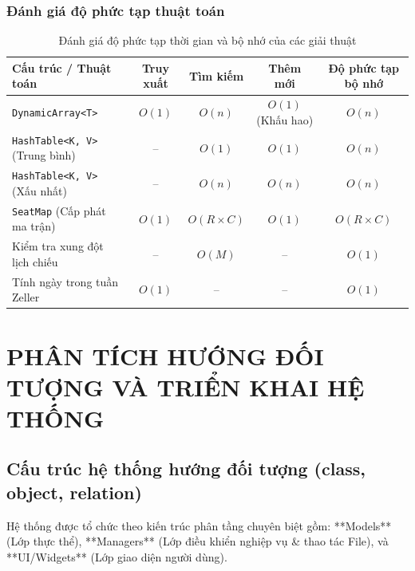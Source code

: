 \documentclass[12pt,a4paper]{article}
\begin{document}
\subsubsection{Đánh giá độ phức tạp thuật toán}
\begin{table}[htbp]
\centering
\caption{Đánh giá độ phức tạp thời gian và bộ nhớ của các giải thuật}
\vspace{0.2cm}
\begin{tabular}{lcccc}
\toprule
\textbf{Cấu trúc / Thuật toán} & \textbf{Truy xuất} & \textbf{Tìm kiếm} & \textbf{Thêm mới} & \textbf{Độ phức tạp bộ nhớ} \\
\midrule
\texttt{DynamicArray<T>} & $O(1)$ & $O(n)$ & $O(1)$ (Khấu hao) & $O(n)$ \\
\texttt{HashTable<K, V>} (Trung bình) & -- & $O(1)$ & $O(1)$ & $O(n)$ \\
\texttt{HashTable<K, V>} (Xấu nhất) & -- & $O(n)$ & $O(n)$ & $O(n)$ \\
\texttt{SeatMap} (Cấp phát ma trận) & $O(1)$ & $O(R \times C)$ & $O(1)$ & $O(R \times C)$ \\
Kiểm tra xung đột lịch chiếu & -- & $O(M)$ & -- & $O(1)$ \\
Tính ngày trong tuần Zeller & $O(1)$ & -- & -- & $O(1)$ \\
\bottomrule
\end{tabular}
\end{table}

\section{PHÂN TÍCH HƯỚNG ĐỐI TƯỢNG VÀ TRIỂN KHAI HỆ THỐNG}

\subsection{Cấu trúc hệ thống hướng đối tượng (class, object, relation)}
Hệ thống được tổ chức theo kiến trúc phân tầng chuyên biệt gồm: **Models** (Lớp thực thể), **Managers** (Lớp điều khiển nghiệp vụ \& thao tác File), và **UI/Widgets** (Lớp giao diện người dùng).
\end{document}
